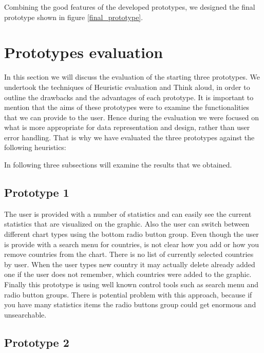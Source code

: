 \documentclass[a4paper]{article}
\begin{document}
Combining the good features of the developed prototypes, we designed the final prototype shown in figure \ref{final_prototype}.



\section{Prototypes evaluation}

In this section we will discuss the evaluation of the starting three prototypes. We undertook the techniques of Heuristic evaluation and Think aloud, in order to outline the drawbacks and the advantages of each prototype. It is important to mention that the aims of these prototypes were to examine the functionalities that we can provide to the user. Hence during the evaluation we were focused on what is more appropriate for data representation and design, rather than user error handling. That is why we have evaluated the three prototypes against the following heuristics:

In following three subsections will examine the results that we obtained.

\subsection{Prototype 1}

The user is provided with a number of statistics and can easily see the current statistics that are visualized on the graphic. Also the user can switch between different chart types using the bottom radio button group. Even though the user is provide with a search menu for countries, is not clear how you add or how you remove countries from the chart. There is no list of currently selected countries by user. When the user types new country it may actually delete already added one if the user does not remember, which countries were added to the graphic. Finally this prototype is using well known control tools such as search menu and radio button groups. There is potential problem with this approach, because if you have many statistics items the radio buttons group could get enormous and unsearchable.

\subsection{Prototype 2}
\end{document}
